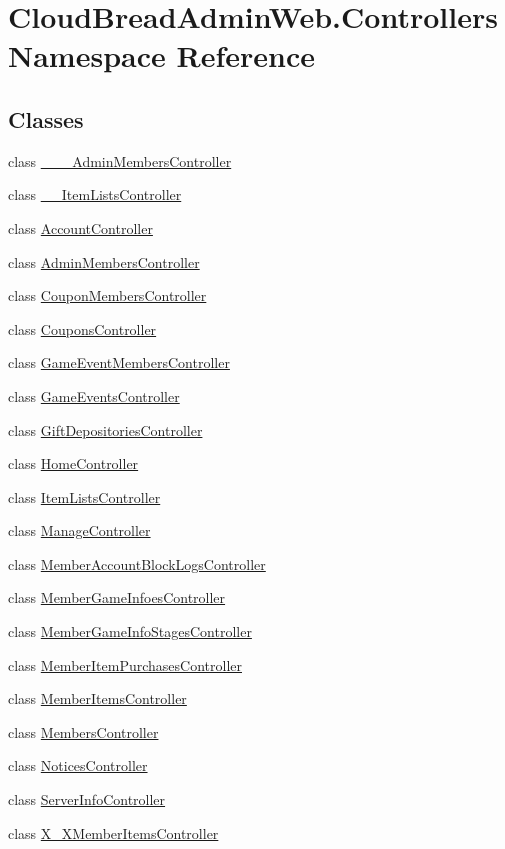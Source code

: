 \hypertarget{a00420}{}\section{Cloud\+Bread\+Admin\+Web.\+Controllers Namespace Reference}
\label{a00420}
\subsection*{Classes}
\begin{DoxyCompactItemize}
\item 
class \hyperlink{a00005}{\+\_\+\+\_\+\+\_\+\+Admin\+Members\+Controller}
\item 
class \hyperlink{a00006}{\+\_\+\+\_\+\+Item\+Lists\+Controller}
\item 
class \hyperlink{a00007}{Account\+Controller}
\item 
class \hyperlink{a00013}{Admin\+Members\+Controller}
\item 
class \hyperlink{a00070}{Coupon\+Members\+Controller}
\item 
class \hyperlink{a00071}{Coupons\+Controller}
\item 
class \hyperlink{a00082}{Game\+Event\+Members\+Controller}
\item 
class \hyperlink{a00084}{Game\+Events\+Controller}
\item 
class \hyperlink{a00087}{Gift\+Depositories\+Controller}
\item 
class \hyperlink{a00089}{Home\+Controller}
\item 
class \hyperlink{a00128}{Item\+Lists\+Controller}
\item 
class \hyperlink{a00133}{Manage\+Controller}
\item 
class \hyperlink{a00136}{Member\+Account\+Block\+Logs\+Controller}
\item 
class \hyperlink{a00138}{Member\+Game\+Infoes\+Controller}
\item 
class \hyperlink{a00140}{Member\+Game\+Info\+Stages\+Controller}
\item 
class \hyperlink{a00142}{Member\+Item\+Purchases\+Controller}
\item 
class \hyperlink{a00144}{Member\+Items\+Controller}
\item 
class \hyperlink{a00146}{Members\+Controller}
\item 
class \hyperlink{a00169}{Notices\+Controller}
\item 
class \hyperlink{a00179}{Server\+Info\+Controller}
\item 
class \hyperlink{a00194}{X\+\_\+\+X\+Member\+Items\+Controller}
\end{DoxyCompactItemize}
